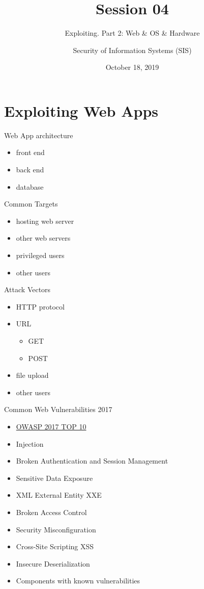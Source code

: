 \documentclass{curs}
\title[Session 04]{Session 04}
\subtitle{Exploiting. Part 2: Web \& OS \& Hardware}
\author{Security of Information Systems (SIS)}
\date{October 18, 2019}
\begin{document}
\frame{\titlepage}


\section{Exploiting Web Apps}

\begin{frame}{Web App architecture}
  \begin{itemize}
    \item front end
    \item back end
    \item database
  \end{itemize}
\end{frame}

\begin{frame}{Common Targets}
  \begin{itemize}
    \item hosting web server
    \item other web servers
    \item privileged users
    \item other users
  \end{itemize}
\end{frame}

\begin{frame}{Attack Vectors}
  \begin{itemize}
    \item HTTP protocol
    \item URL
      \begin{itemize}
        \item GET
        \item POST
      \end{itemize}
    \item file upload
    \item other users
  \end{itemize}
\end{frame}

\begin{frame}{Common Web Vulnerabilities 2017}
  \begin{itemize}
    \item \href{https://github.com/OWASP/Top10/blob/master/2017/}{OWASP 2017 TOP 10}
    \item Injection
    \item Broken Authentication and Session Management
    \item Sensitive Data Exposure
    \item XML External Entity XXE
    \item Broken Access Control
    \item Security Misconfiguration
    \item Cross-Site Scripting XSS
    \item Insecure Deserialization
    \item Components with known vulnerabilities
  \end{itemize}
\end{frame}
\end{document}
